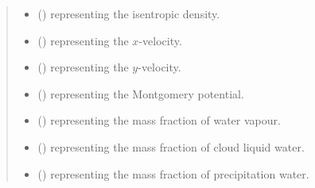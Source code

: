 \documentclass[letterpaper,10pt,english]{sphinxmanual}
\begin{document}
\begin{fulllineitems}
\begin{fulllineitems}
\begin{quote}
\begin{description}
\begin{itemize}
\item {} 
 () \textendash{}  representing the isentropic density.

\item {} 
 () \textendash{}  representing the \(x\)-velocity.

\item {} 
 () \textendash{}  representing the \(y\)-velocity.

\item {} 
 () \textendash{}  representing the Montgomery potential.

\item {} 
 () \textendash{}  representing the mass fraction of water vapour.

\item {} 
 () \textendash{}  representing the mass fraction of cloud liquid water.

\item {} 
 () \textendash{}  representing the mass fraction of precipitation water.

\end{itemize}

\end{description}\end{quote}

\end{fulllineitems}



\end{fulllineitems}
\end{document}
